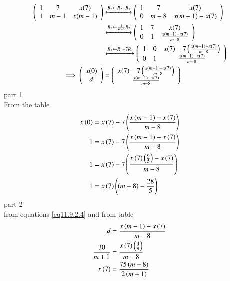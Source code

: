 \documentclass[journal,12pt,twocolumn]{IEEEtran}
\theoremstyle{remark}
\begin{document}
\begin{align}
\left(
\begin{array}{ccc}
1 & 7 & x(7) \\
1 & m-1 & x(m-1)
\end{array}
\right)
&\xleftrightarrow[]{R_2 \leftarrow R_2-R_1}
\left(
\begin{array}{ccc}
1 & 7 & x(7) \\
0 & m-8 & x(m-1)-x(7)
\end{array}
\right)
\\
&\xleftrightarrow[]{R_2 \leftarrow \frac{1}{m-8}R_2}
\left(
\begin{array}{ccc}
1 & 7 & x(7) \\
0 & 1 & \frac{x(m-1)-x(7)}{m-8}
\end{array}
\right)
\\
&\xleftrightarrow[]{R_1 \leftarrow R_1-7R_2}
\left(
\begin{array}{ccc}
1 & 0 & x(7)-7\left(\frac{x(m-1)-x(7)}{m-8}\right) \\
0 & 1 & \frac{x(m-1)-x(7)}{m-8}
\end{array}
\right)
\\
\implies \left(
\begin{array}{c}
x(0) \\
d
\end{array}
\right)
&=
\left(
\begin{array}{c}
x(7)-7\left(\frac{x(m-1)-x(7)}{m-8}\right) \\
\frac{x(m-1)-x(7)}{m-8}
\end{array}
\right)
\end{align}
part 1\\
From the table \\
\begin{align}
    x\left(0\right)&=x\left(7\right)-7\left(\frac{x\left(m-1\right)-x\left(7\right)}{m-8}\right)\\
    1&=x\left(7\right)-7\left(\frac{x\left(m-1\right)-x\left(7\right)}{m-8}\right)\\
    1&=x\left(7\right)-7\left(\frac{x\left(7\right)\left(\frac{9}{5}\right)-x\left(7\right)}{m-8}\right)\\
    1&=x\left(7\right)\left(\left(m-8\right)-\frac{28}{5}\right) \label{eq11.9.2.14}
\end{align}
part 2\\
from equations \eqref{eq11.9.2.4} and from table\\
 \begin{align}
    d&=\frac{x\left(m-1\right)-x\left(7\right)}{m-8}\\
    \frac{30}{m+1}&=\frac{x\left(7\right)\left(\frac{4}{9}\right)}{m-8}\\ \label{eq11.9.2.17}
    x\left(7\right)&=\frac{75\left(m-8\right)}{2\left(m+1\right)}
 \end{align}
\end{document}
